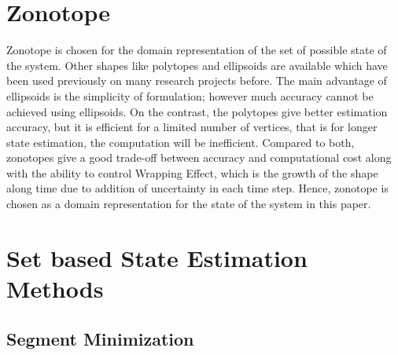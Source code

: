 \section{Zonotope}
Zonotope is chosen for the domain representation of the set of possible state of the system. Other shapes like polytopes and ellipsoids are available which have been used previously on many research projects before. The main advantage of ellipsoids is the simplicity of formulation; however much accuracy cannot be achieved using ellipsoids. On the contrast, the polytopes give better estimation accuracy, but it is efficient for a limited number of vertices, that is for longer state estimation, the computation will be inefficient. Compared to both, zonotopes give a good trade-off between accuracy and computational cost along with the ability to control Wrapping Effect, which is the growth of the shape along time due to addition of uncertainty in each time step. Hence, zonotope is chosen as a domain representation for the state of the system in this paper.
\section{Set based State Estimation Methods}
\subsection{Segment Minimization}

